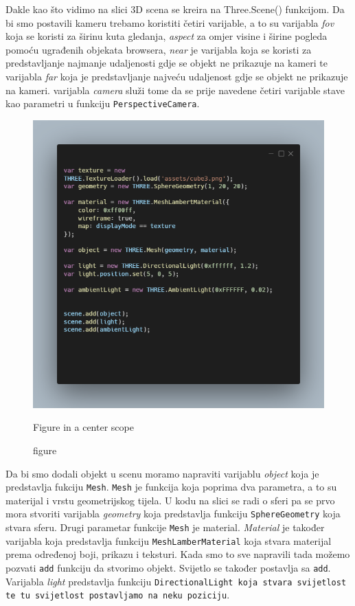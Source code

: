 \documentclass[a4paper,12pt]{article}
\begin{document}
Dakle kao što vidimo na slici 3D scena se kreira na Three.Scene() funkcijom. Da bi smo postavili kameru trebamo koristiti četiri varijable, a to su 
varijabla \textit{fov} koja se koristi za širinu kuta gledanja, \textit{aspect} za omjer visine i širine pogleda pomoću ugrađenih objekata browsera, \textit{near} je 
varijabla koja se koristi za predstavljanje najmanje udaljenosti gdje se objekt ne prikazuje na kameri te varijabla \textit{far} koja je predstavljanje najveću 
udaljenost gdje se objekt ne prikazuje na kameri.
varijabla \textit{camera} služi tome da se prije navedene četiri varijable stave kao parametri u funkciju \texttt{PerspectiveCamera}.

\begin{figure}
    \centering
    \includegraphics[scale=0.5]{image/zadatak1_objekti.png}
    \caption{figure}{Figure in a center scope}
\end{figure}


Da bi smo dodali objekt u scenu moramo napraviti varijablu \textit{object} koja je predstavlja fukciju \texttt{Mesh}. \texttt{Mesh} je funkcija koja poprima dva parametra, a to su materijal i 
vrstu geometrijskog tijela. U kodu na slici se radi o sferi pa se prvo mora stvoriti varijabla \textit{geometry} koja predstavlja funkciju \texttt{SphereGeometry} koja stvara sferu.
Drugi parametar funkcije \texttt{Mesh} je material. \textit{Material} je također varijabla koja predstavlja funkciju \texttt{MeshLamberMaterial} koja stvara materijal prema određenoj boji, 
prikazu i teksturi. Kada smo to sve napravili tada možemo pozvati \texttt{add} funkciju da stvorimo objekt. Svijetlo  se također postavlja sa \texttt{add}.
Varijabla \textit{light} predstavlja funkciju \texttt{DirectionalLight koja stvara svijetlost te tu svijetlost postavljamo na neku poziciju}. 
\end{document}
